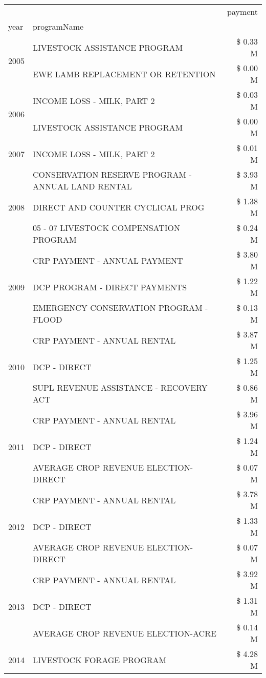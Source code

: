 \begin{tabular}{llr}
\toprule
 &  & payment \\
year & programName &  \\
\midrule
\multirow[t]{2}{*}{2005} & LIVESTOCK ASSISTANCE PROGRAM & \$ 0.33 M \\
 & EWE LAMB REPLACEMENT OR RETENTION & \$ 0.00 M \\
\cline{1-3}
\multirow[t]{2}{*}{2006} & INCOME LOSS - MILK, PART 2 & \$ 0.03 M \\
 & LIVESTOCK ASSISTANCE PROGRAM & \$ 0.00 M \\
\cline{1-3}
2007 & INCOME LOSS - MILK, PART 2 & \$ 0.01 M \\
\cline{1-3}
\multirow[t]{3}{*}{2008} & CONSERVATION RESERVE PROGRAM - ANNUAL LAND RENTAL & \$ 3.93 M \\
 & DIRECT AND COUNTER CYCLICAL PROG & \$ 1.38 M \\
 & 05 - 07 LIVESTOCK COMPENSATION PROGRAM & \$ 0.24 M \\
\cline{1-3}
\multirow[t]{3}{*}{2009} & CRP PAYMENT - ANNUAL PAYMENT & \$ 3.80 M \\
 & DCP PROGRAM - DIRECT PAYMENTS & \$ 1.22 M \\
 & EMERGENCY CONSERVATION PROGRAM - FLOOD & \$ 0.13 M \\
\cline{1-3}
\multirow[t]{3}{*}{2010} & CRP PAYMENT - ANNUAL RENTAL & \$ 3.87 M \\
 & DCP - DIRECT & \$ 1.25 M \\
 & SUPL REVENUE ASSISTANCE - RECOVERY ACT & \$ 0.86 M \\
\cline{1-3}
\multirow[t]{3}{*}{2011} & CRP PAYMENT - ANNUAL RENTAL & \$ 3.96 M \\
 & DCP - DIRECT & \$ 1.24 M \\
 & AVERAGE CROP REVENUE ELECTION-DIRECT & \$ 0.07 M \\
\cline{1-3}
\multirow[t]{3}{*}{2012} & CRP PAYMENT - ANNUAL RENTAL & \$ 3.78 M \\
 & DCP - DIRECT & \$ 1.33 M \\
 & AVERAGE CROP REVENUE ELECTION-DIRECT & \$ 0.07 M \\
\cline{1-3}
\multirow[t]{3}{*}{2013} & CRP PAYMENT - ANNUAL RENTAL & \$ 3.92 M \\
 & DCP - DIRECT & \$ 1.31 M \\
 & AVERAGE CROP REVENUE ELECTION-ACRE & \$ 0.14 M \\
\cline{1-3}
\multirow[t]{3}{*}{2014} & LIVESTOCK FORAGE PROGRAM & \$ 4.28 M \\

\end{tabular}
